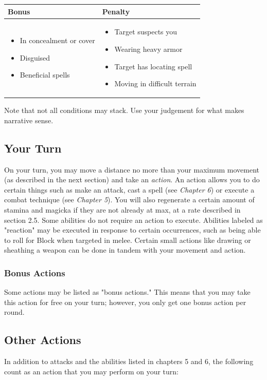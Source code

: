 \documentclass[12pt]{book}
\begin{document}
\begin{tabular}{p{}|p{}}

Bonus & Penalty\\ \hline
	\begin{itemize}
		\item In concealment or cover
		\item Disguised
		\item Beneficial spells
	\end{itemize}
	&
	\begin{itemize}
		\item Target suspects you
		\item Wearing heavy armor
		\item Target has locating spell
		\item Moving in difficult terrain
	\end{itemize}\\

\end{tabular}

Note that not all conditions may stack. Use your judgement for what makes narrative sense.

\subsection{Your Turn}
On your turn, you may move a distance no more than your maximum movement (as described in the next section) and take an \textit{action}. An action allows you to do certain things such as make an attack, cast a spell (see \textit{Chapter 6}) or execute a combat technique (see \textit{Chapter 5}). You will also regenerate a certain amount of stamina and magicka if they are not already at max, at a rate described in section 2.5. Some abilities do not require an action to execute. Abilities labeled as "reaction" may be executed in response to certain occurrences, such as being able to roll for Block when targeted in melee. Certain small actions like drawing or sheathing a weapon can be done in tandem with your movement and action.

\subsubsection{Bonus Actions}
Some actions may be listed as "bonus actions." This means that you may take this action for free on your turn; however, you only get one bonus action per round.

\subsection{Other Actions}
In addition to attacks and the abilities listed in chapters 5 and 6, the following count as an action that you may perform on your turn:
\end{document}
